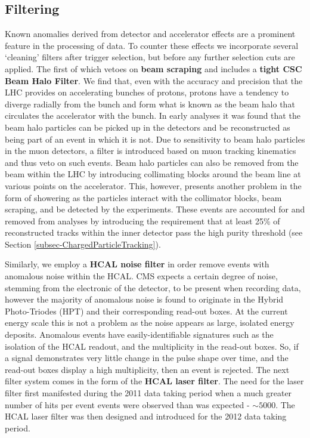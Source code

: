 \subsection{Filtering}

Known anomalies derived from detector and accelerator effects are a prominent feature in the processing of data. To counter these effects we incorporate several `cleaning' filters after trigger selection, but before any further selection cuts are applied. The first of which vetoes on \textbf{beam scraping} and includes a \textbf{tight CSC Beam Halo Filter}. We find that, even with the accuracy and precision that the LHC provides on accelerating bunches of protons, protons have a tendency to diverge radially from the bunch and form what is known as the beam halo that circulates the accelerator with the bunch. In early analyses it was found that the beam halo particles can be picked up in the detectors and be reconstructed as being part of an event in which it is not. Due to sensitivity to beam halo particles in the muon detectors, a filter is introduced based on muon tracking kinematics and thus veto on such events. Beam halo particles can also be removed from the beam within the LHC by introducing collimating blocks around the beam line at various points on the accelerator. This, however, presents another problem in the form of showering as the particles interact with the collimator blocks, beam scraping, and be detected by the experiments. These events are accounted for and removed from analyses by introducing the requirement that at least 25\% of reconstructed tracks within the inner detector pass the high purity threshold (see Section \ref{subsec-ChargedParticleTracking}). 

Similarly, we employ a \textbf{HCAL noise filter} in order remove events with anomalous noise within the HCAL. CMS expects a certain degree of noise, stemming from the electronic of the detector, to be present when recording data, however the majority of anomalous noise is found to originate in the Hybrid Photo-Triodes (HPT) and their corresponding read-out boxes. At the current energy scale this is not a problem as the noise appears as large, isolated energy deposits. Anomalous events have easily-identifiable signatures such as the isolation of the HCAL readout, and the multiplicity in the read-out boxes. So, if a signal demonstrates very little change in the pulse shape over time, and the read-out boxes display a high multiplicity, then an event is rejected. The next filter system comes in the form of the \textbf{HCAL laser filter}. The need for the laser filter first manifested during the 2011 data taking period when a much greater number of hits per event events were observed than was expected - $\sim5000$. The HCAL laser filter was then designed and introduced for the 2012 data taking period.  

